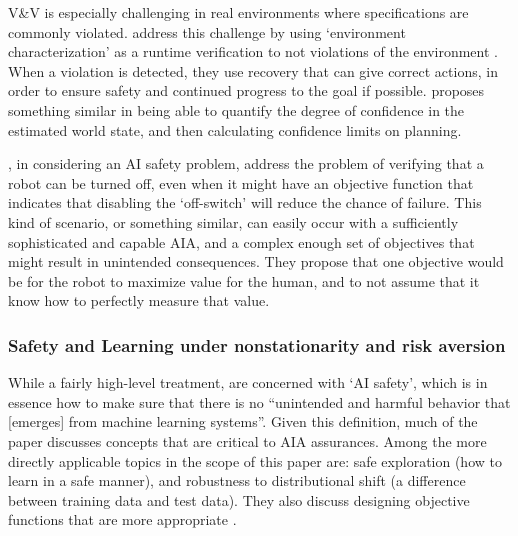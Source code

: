     V\&V is especially challenging in real environments where specifications are commonly  violated. \citet{Weng_Wong2014-tj} address this challenge by using `environment characterization' as a runtime verification to not violations of the environment . When a violation is detected, they use recovery that can give correct actions, in order to ensure safety and continued progress to the goal if possible. \citet{Nishi2016-zq} proposes something similar in being able to quantify the degree of confidence in the estimated world state, and then calculating confidence limits on planning.

    \citet{Hadfield-Menell2016-ws}, in considering an AI safety problem, address the problem of verifying that a robot can be turned off, even when it might have an objective function that indicates that disabling the `off-switch' will reduce the chance of failure. This kind of scenario, or something similar, can easily occur with a sufficiently sophisticated and capable AIA, and a complex enough set of objectives that might result in unintended consequences. They propose that one objective would be for the robot to maximize value for the human, and to not assume that it know how to perfectly measure that value. 

\subsubsection{Safety and Learning under nonstationarity and risk aversion}
    While a fairly high-level treatment, \citet{Amodei2016-xi} are concerned with `AI safety', which is in essence how to make sure that there is no ``unintended and harmful behavior that [emerges] from machine learning systems''. Given this definition, much of the paper discusses concepts that are critical to AIA assurances. Among the more directly applicable topics in the scope of this paper are: safe exploration (how to learn in a safe manner), and robustness to distributional shift (a difference between training data and test data). They also discuss designing objective functions that are more appropriate .

